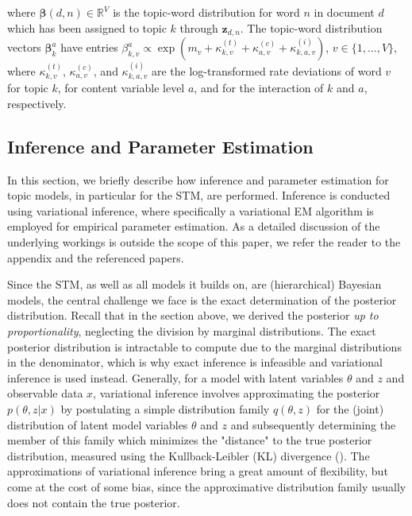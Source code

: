 where $\boldsymbol{\beta}(d,n) \in \mathbb{R}^V$ is the topic-word distribution for word $n$ in document $d$ which has been assigned to topic $k$ through $\boldsymbol{z}_{d,n}$. The topic-word distribution vectors $\boldsymbol{\beta}_k^{a}$ have entries $\beta_{k,v}^{a} \propto \exp(m_{v} + \kappa_{k,v}^{(t)} + \kappa_{a,v}^{(c)} + \kappa_{k, a,v}^{(i)})$, $v \in \{1,\dots,V\}$, where $\kappa_{k,v}^{(t)}$, $\kappa_{a,v}^{(c)}$, and $\kappa_{k,a,v}^{(i)}$ are the log-transformed rate deviations of word $v$ for topic $k$, for content variable level $a$, and for the interaction of $k$ and $a$, respectively.

\subsection{Inference and Parameter Estimation}
\label{Inference and Parameter Estimation}

In this section, we briefly describe how inference and parameter estimation for topic models, in particular for the STM, are performed. Inference is conducted using variational inference, where specifically a variational EM algorithm is employed for empirical parameter estimation. As a detailed discussion of the underlying workings is outside the scope of this paper, we refer the reader to the appendix and the referenced papers.

Since the STM, as well as all models it builds on, are (hierarchical) Bayesian models, the central challenge we face is the exact determination of the posterior distribution. Recall that in the section above, we derived the posterior \textit{up to proportionality}, neglecting the division by marginal distributions. The exact posterior distribution is intractable to compute due to the marginal distributions in the denominator, which is why exact inference is infeasible and variational inference is used instead. Generally, for a model with latent variables $\theta$ and $z$ and observable data $x$, variational inference involves approximating the posterior $p(\theta,z|x)$ by postulating a simple distribution family $q(\theta,z)$ for the (joint) distribution of latent model variables $\theta$ and $z$ and subsequently determining the member of this family which minimizes the "distance" to the true posterior distribution, measured using the Kullback-Leibler (KL) divergence (\citealp{wang2013variational}). The approximations of variational inference bring a great amount of flexibility, but come at the cost of some bias, since the approximative distribution family usually does not contain the true posterior.

